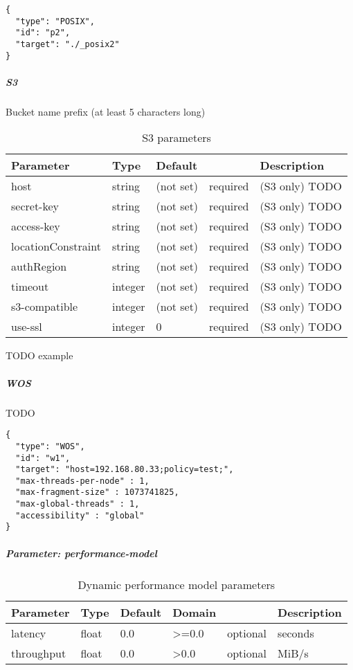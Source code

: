 \begin{lstlisting}
{
  "type": "POSIX",
  "id": "p2",
  "target": "./_posix2"
}
\end{lstlisting}

\subparagraph{S3}
Bucket name prefix (at least 5 characters long)

\begin{table}[!h]
  \begin{center}
    \begin{tabularx}{\textwidth}{llllX}
      Parameter              & Type    & Default    &          & Description \\
      \hline
      host                   & string  & (not set)  & required & (S3 only) TODO \\
      secret-key             & string  & (not set)  & required & (S3 only) TODO \\
      access-key             & string  & (not set)  & required & (S3 only) TODO \\
      locationConstraint     & string  & (not set)  & required & (S3 only) TODO \\
      authRegion             & string  & (not set)  & required & (S3 only) TODO \\
      timeout                & integer & (not set)  & required & (S3 only) TODO \\
      s3-compatible          & integer & (not set)  & required & (S3 only) TODO \\
      use-ssl                & integer & 0          & required & (S3 only) TODO \\
    \end{tabularx}
  \end{center}
  \caption{S3 parameters}%
  \label{tab:s3_params}
\end{table}

TODO example

\subparagraph{WOS}
TODO

\begin{lstlisting}
{
  "type": "WOS",
  "id": "w1",
  "target": "host=192.168.80.33;policy=test;",
  "max-threads-per-node" : 1,
  "max-fragment-size" : 1073741825,
  "max-global-threads" : 1,
  "accessibility" : "global"
}
\end{lstlisting}


\subparagraph{Parameter: performance-model}


\begin{table}[!ht]
  \begin{center}
    \begin{tabularx}{\textwidth}{lllllX}
      Parameter  & Type  & Default & Domain &          & Description \\ 
      \hline
      latency    & float & 0.0     & >=0.0  & optional & seconds     \\ 
      throughput & float & 0.0     & >0.0   & optional & MiB/s       \\ 
    \end{tabularx}
  \end{center}
  \caption{Dynamic performance model parameters}%
  \label{tab:dyn_perf_model_conf_params}
\end{table}


